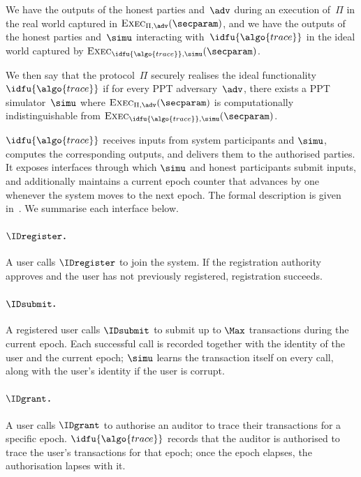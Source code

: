 We have the outputs of the honest parties and~$\adv$ during an execution
of~$\Pi$ in the real world captured in $\textsc{Exec}_{\Pi,\adv}(\secparam)$,
and we have the outputs of the honest parties and~$\simu$ interacting
with~$\idfu{\algo{trace}}$ in the ideal world captured by
$\textsc{Exec}_{\idfu{\algo{trace}},\simu}(\secparam)$.

We then say that the protocol~$\Pi$ securely realises the ideal
functionality~$\idfu{\algo{trace}}$ if for every PPT adversary~$\adv$, there
exists a PPT simulator~$\simu$ where $\textsc{Exec}_{\Pi,\adv}(\secparam)$ is
computationally indistinguishable from
$\textsc{Exec}_{\idfu{\algo{trace}},\simu}(\secparam)$.

$\idfu{\algo{trace}}$ receives inputs from system participants and $\simu$,
computes the corresponding outputs, and delivers them to the authorised
parties. It exposes interfaces through which $\simu$ and honest participants
submit inputs, and additionally maintains a current epoch counter that advances
by one whenever the system moves to the next epoch. The formal description is
given in~. We summarise each interface below.

\paragraph{$\IDregister$.} A user calls $\IDregister$ to join the system. If
the registration authority approves and the user has not previously registered,
registration succeeds.

\paragraph{$\IDsubmit$.} A registered user calls $\IDsubmit$ to submit up to
$\Max$ transactions during the current epoch. Each successful call is recorded
together with the identity of the user and the current epoch; $\simu$ learns
the transaction itself on every call, along with the user's identity if the
user is corrupt.

\paragraph{$\IDgrant$.} A user calls $\IDgrant$ to authorise an auditor to
trace their transactions for a specific epoch. $\idfu{\algo{trace}}$ records
that the auditor is authorised to trace the user's transactions for that epoch;
once the epoch elapses, the authorisation lapses with it.

